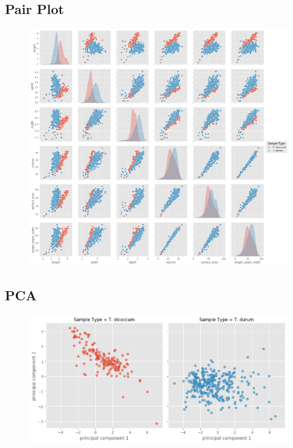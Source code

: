 \documentclass[11pt]{report}
\begin{document}
\subsection{Pair Plot}
\label{sec:org1e11d3f}

\begin{figure}[htbp]
\centering
\includegraphics[width=18cm]{./images/results/group5/pairplot.png}
\label{fig:org2a1ad24}
\end{figure}

\clearpage
\subsection{PCA}
\label{sec:org550bdc1}
\begin{figure}[htbp]
\centering
\includegraphics[width=18cm]{./images/results/group5/pca.png}
\label{fig:org76b1d12}
\end{figure}
\end{document}
